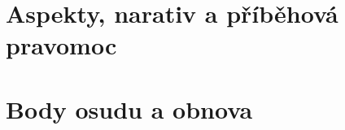 \documentclass[../main.tex]{subfiles}
\begin{document}
\section{Aspekty, narativ a příběhová pravomoc}
\label{sec:aspekty-narativ-pribeh}

\section{Body osudu a obnova}
\label{sec:body-osudu-obnova}
\end{document}
